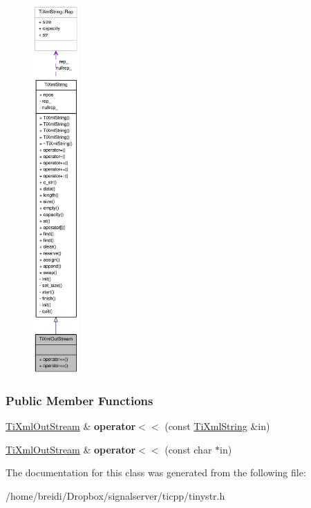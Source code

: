 \begin{figure}[H]
\begin{center}
\leavevmode
\includegraphics[height=400pt]{class_ti_xml_out_stream__coll__graph}
\end{center}
\end{figure}
\subsubsection*{Public Member Functions}
\begin{DoxyCompactItemize}
\item 
\hypertarget{class_ti_xml_out_stream_a3640dcb1c0903be3bc6966cdc9a79db6}{
\hyperlink{class_ti_xml_out_stream}{TiXmlOutStream} \& {\bfseries operator$<$$<$} (const \hyperlink{class_ti_xml_string}{TiXmlString} \&in)}
\label{class_ti_xml_out_stream_a3640dcb1c0903be3bc6966cdc9a79db6}

\item 
\hypertarget{class_ti_xml_out_stream_af2117e5a8cbfcb69544804ad2859bfb6}{
\hyperlink{class_ti_xml_out_stream}{TiXmlOutStream} \& {\bfseries operator$<$$<$} (const char $\ast$in)}
\label{class_ti_xml_out_stream_af2117e5a8cbfcb69544804ad2859bfb6}

\end{DoxyCompactItemize}


The documentation for this class was generated from the following file:\begin{DoxyCompactItemize}
\item 
/home/breidi/Dropbox/signalserver/ticpp/tinystr.h\end{DoxyCompactItemize}
